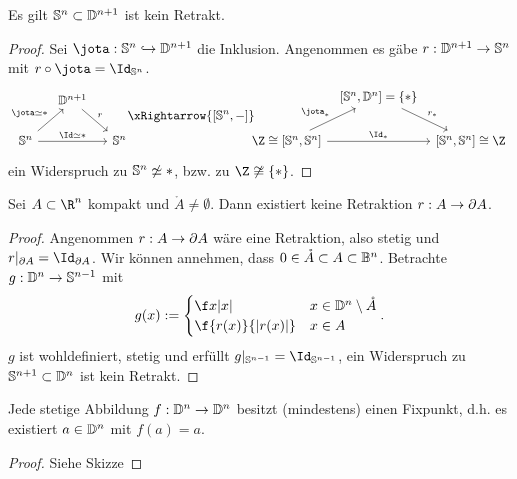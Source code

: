 \begin{kor}
	Es gilt $\mathbb{S}^n \subset \mathbb{D}^{n+1}$ ist kein Retrakt.
	\begin{proof}
		Sei $\jota: \S^n \injto \D^{n+1}$ die Inklusion.
		Angenommen es gäbe $r: \mathbb{D}^{n+1} \to \mathbb{S}^n$ mit $r \circ \jota = \Id_{\S^n}$.
		\[
			\begin{tikzcd}[column sep=small]
				~& \D^{n+1} \arrow{dr}{r} &\\
				\S^n \arrow{rr}{\Id \homotopic *}\arrow{ur}{\jota\homotopic *} & & \S^n
			\end{tikzcd}
			\!\!\xRightarrow{[\S^n, -]}\!\!\!\!
			\begin{tikzcd}[column sep=tiny]
				~& {[\S^n, \D^n] = \{*\}} \arrow{dr}{r_*} & \\
				{\Z \homeomorphic [\S^n, \S^n]} \arrow{ur}{\jota_*} \arrow{rr}{\Id_*} & & {[\S^n, \S^n] \homeomorphic \Z}
			\end{tikzcd}
		\]
		ein Widerspruch zu $\mathbb{S}^n \not\simeq *$, bzw. zu $\Z \not\homeomorphic \{*\}$.
	\end{proof}
\end{kor}

\begin{st}
	Sei $A \subset \R^n$ kompakt und $\mathring A \neq \emptyset$.
	Dann existiert keine Retraktion $r: A \to \partial A$.
	\begin{proof}
		Angenommen $r: A \to \partial A$ wäre eine Retraktion, also stetig und $r|_{\boundary A} = \Id_{\boundary A}$.
		Wir können \oBdA annehmen, dass $0 \in \mathring A \subset A \subset \mathbb{B}^n$.
		Betrachte $g: \mathbb{D}^n \to \mathbb{S}^{n-1}$ mit
		\[
			g(x) := \begin{cases}
				\f x{|x|} & x \in \D^n \setminus \mathring A \\
				\f {r(x)}{|r(x)|} & x \in A
			\end{cases}.
		\]
		$g$ ist wohldefiniert, stetig und erfüllt $g|_{\S^{n-1}} = \Id_{\S^{n-1}}$, ein Widerspruch zu $\mathbb{S}^{n+1} \subset \mathbb{D}^n$ ist kein Retrakt.
	\end{proof}
\end{st}

\begin{st}
	Jede stetige Abbildung $f: \mathbb{D}^n \to \mathbb{D}^n$ besitzt (mindestens) einen Fixpunkt, d.h. es existiert $a \in \mathbb{D}^n$ mit $f(a) = a$.
	\begin{proof}
		Siehe Skizze
	\end{proof}
\end{st}


